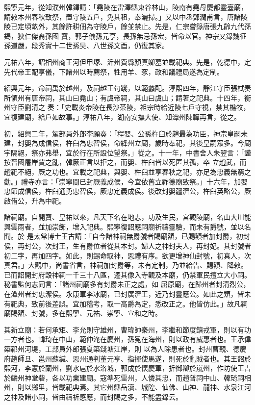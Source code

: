 \begin{pinyinscope}
 熙寧元年，從知濮州韓鐸請：「堯陵在雷澤縣東谷林山，陵南有堯母慶都靈臺廟，請敕本州春秋致祭，置守陵五戶，免其租，奉灑掃。」又以中丞鄧潤甫言，唐諸陵陵已定頃畝外，其餘許耕佃為守陵戶，餘並禁止。先是，仁宗嘗錄唐張九齡九代孫錫，狄仁傑裔孫國
 寶，郭子儀孫元亨，長孫無忌孫宏，皆命以官。神宗又錄魏征孫道嚴，段秀實十二世孫昊、八世孫文酉，仍復其家。



 元祐六年，詔相州商王河但甲塚、沂州費縣顏真卿墓並載祀典。先是，乾德中，定先代帝王配享儀，下諸州以時薦祭，牲用羊、豕，政和議禮局遂為定制。



 紹興元年，命祠禹於越州，及祠越王句踐，以範蠡配。淳熙四年，靜江守臣張栻奏所領州有唐帝祠，其山曰堯山；有虞帝祠，其山曰虞山；請著之祀典。十四年，衡州守臣劉清之
 奏：「史載炎帝陵在長沙茶陵，祖宗時給近陵七戶守視，禁其樵牧，宜復建廟，給戶如故事。」淳祐八年，湖南安撫大使、知潭州陳韡再言，從之。



 初，紹興二年，駕部員外郎李願奏：「程嬰、公孫杵臼於趙最為功臣，神宗皇嗣未建，封嬰為成信侯，杵臼為忠智侯，命絳州立廟，歲時奉祀，其後皇嗣眾多。今廟宇隔絕，祭亦弗舉，宜於行在所設位望祭。」從之。十一年，中書舍人朱翌言：「謹按晉國屠岸賈之亂，韓厥正言以拒之，而嬰、杵臼皆以死匿其孤，卒
 立趙武，而趙祀不絕，厥之功也。宜載之祀典，與嬰、杵臼並享春秋之祀，亦足為忠義無窮之勸。」禮寺亦言：「崇寧間已封厥義成侯，今宜依舊立祚德廟致祭。」十六年，加嬰忠節成信侯，杵臼通勇忠智侯，厥忠定義成侯。後改封嬰疆濟公，杵臼英略公，厥啟侑公，升為中祀。



 諸祠廟。自開寶、皇祐以來，凡天下名在地志，功及生民，宮觀陵廟，名山大川能興雲雨者，並加崇飾，增入祀典。熙寧復詔應祠廟祈禱靈驗，而未有爵號，並以名聞。於
 是太常博士王古請：「自今諸神祠無爵號者賜廟額，已賜額者加封爵，初封侯，再封公，次封王，生有爵位者從其本封。婦人之神封夫人，再封妃。其封號者初二字，再加四字。如此，則錫命馭神，恩禮有序。欲更增神仙封號，初真人，次真君。」大觀中，尚書省言，神祠加封爵等，未有定制，乃並給告、賜額、降敕。已而詔開封府毀神祠一千三十八區，遷其像入寺觀及本廟，仍禁軍民擅立大小祠。秘書監何志同言：「諸州祠廟多有封爵未正之處，如
 屈原廟，在歸州者封清烈公，在潭州者封忠潔侯。永康軍李冰廟，已封廣濟王，近乃封靈應公。如此之類，皆未有祀典，致前後差誤。宜加稽考，取一高爵為定，悉改正之。他皆仿此。」故凡祠廟賜額、封號，多在熙寧、元祐、崇寧、宣和之時。



 其新立廟：若何承矩、李允則守雄州，曹瑋帥秦州，李繼和節度鎮戎軍，則以有功一方者也。韓琦在中山，範仲淹在慶州，孫冕在海州，則以政有威惠者也。王承偉築祁州河堤，工部員外郎張夏築錢塘江岸，則
 以為人除患者也。封州曹覲、德慶府趙師旦、邕州蘇緘、恩州通判董元亨、指揮使馬遂，則死於亂賊者也。其王韶於熙河，李憲於蘭州，劉水扈於水洛城，郭成於懷慶軍，折御卿於嵐州，作坊使王吉於麟州神堂砦，各以功業建廟。寇準死雷州，人憐其忠，而趙普祠中山、韓琦祠相州，則以鄉里，皆載祀典焉。其它州縣岳瀆、城隍、仙佛、山神、龍神、水泉江河之神及諸小祠，皆由禱祈感應，而封賜之多，不能盡錄云。



\end{pinyinscope}